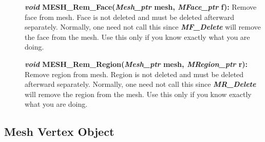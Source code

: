 \documentclass[12pt]{article}
\begin{document}
\begin{description}
\item[]\textbf{\textit{void} MESH\_Rem\_Face(\textit{Mesh\_ptr} mesh,
    \textit{MFace\_ptr} f):} Remove face from mesh. Face is not
  deleted and must be deleted afterward separately. Normally, one need
  not call this since \textbf{\textit{MF\_Delete}} will remove the
  face from the mesh. Use this only if you know exactly what you are
  doing.
  
\item[]\textbf{\textit{void} MESH\_Rem\_Region(\textit{Mesh\_ptr}
    mesh, \textit{MRegion\_ptr} r):} Remove region from mesh. Region
  is not deleted and must be deleted afterward separately. Normally,
  one need not call this since \textbf{\textit{MR\_Delete}} will
  remove the region from the mesh. Use this only if you know exactly
  what you are doing.
\end{description}

\newpage
\subsection{Mesh Vertex Object}
\end{document}
